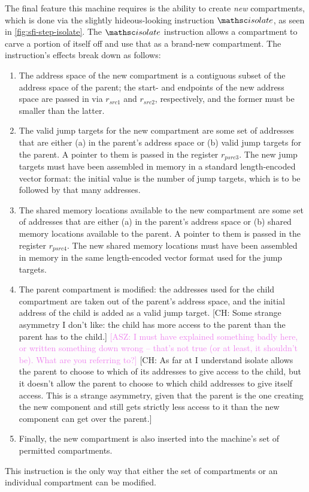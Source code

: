 \documentclass[12pt]{amsart}
\newif\ifdraft\drafttrue
\newcommand{\asz}[1]{\ifdraft\textcolor{violet}{[ASZ: #1]}\fi}
\newcommand{\comm}[3]{\ifdraft\textcolor{#1}{[#2: #3]}\fi}
\newcommand{\ch}[1]{\comm{dkgreen}{CH}{#1}} %
\begin{document}
The final feature this machine requires is the ability to create \emph{new}
compartments, which is done via the slightly hideous-looking instruction
$\opcode{isolate}$, as seen in \cref{fig:sfi-step-isolate}.  The
$\opcode{isolate}$ instruction allows a compartment to carve a portion of itself
off and use that as a brand-new compartment.  The instruction's effects break
down as follows:
\begin{enumerate}
\item The address space of the new compartment is a contiguous subset of the
  address space of the parent; the start- and endpoints of the new address space
  are passed in via $r_{\mathit{src1}}$ and $r_{\mathit{src2}}$, respectively,
  and the former must be smaller than the latter.

\item The valid jump targets for the new compartment are some set of addresses
  that are either (a) in the parent's address space or (b) valid jump targets
  for the parent.  A pointer to them is passed in the register
  $r_{\mathit{psrc3}}$.  The new jump targets must have been assembled in memory
  in a standard length-encoded vector format: the initial value is the number of
  jump targets, which is to be followed by that many addresses.

\item The shared memory locations available to the new compartment are some set
  of addresses that are either (a) in the parent's address space or (b) shared
  memory locations available to the parent.  A pointer to them is passed in
  the register $r_{\mathit{psrc4}}$.  The new shared memory locations must have been
  assembled in memory in the same length-encoded vector format used for the jump
  targets.

\item The parent compartment is modified: the addresses used for the child
  compartment are taken out of the parent's address space, and the initial
  address of the child is added as a valid jump target.
  \ch{Some strange asymmetry I don't like: the child has more access to the
    parent than the parent has to the child.}%
  \asz{I must have explained something badly here, or written something down
    wrong -- that's not true (or at least, it shouldn't be).  What are you
    referring to?}
  \ch{As far at I understand isolate allows the parent to choose to
    which of its addresses to give access to the child, but it doesn't
    allow the parent to choose to which child addresses to give itself
    access. This is a strange asymmetry, given that the parent is the
    one creating the new component and still gets strictly less access
    to it than the new component can get over the parent.}

\item Finally, the new compartment is also inserted into the machine's set of
  permitted compartments.
\end{enumerate}
This instruction is the only way that either the set of compartments or an
individual compartment can be modified.
\end{document}
